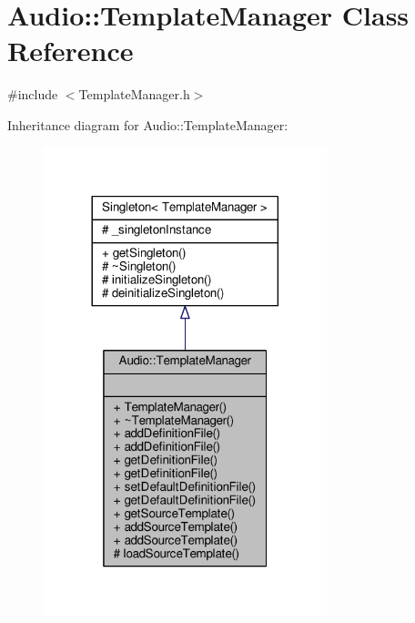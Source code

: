 \hypertarget{classAudio_1_1TemplateManager}{}\section{Audio\+:\+:Template\+Manager Class Reference}
\label{classAudio_1_1TemplateManager}


{\ttfamily \#include $<$Template\+Manager.\+h$>$}



Inheritance diagram for Audio\+:\+:Template\+Manager\+:
\nopagebreak
\begin{figure}[H]
\begin{center}
\leavevmode
\includegraphics[width=233pt]{d4/d38/classAudio_1_1TemplateManager__inherit__graph}
\end{center}
\end{figure}


